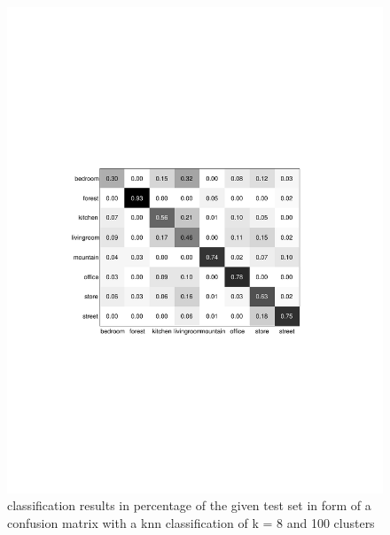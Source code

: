 \documentclass[subfigure,epsfig,fleqn,float,numbers=noenddot]{scrartcl}
\begin{document}
\begin{figure}
		\centering
		\includegraphics[width=\textwidth]{img/conf_matrix_k8_c100.pdf}
		\caption{classification results in percentage of the given test set in form of a confusion matrix with a knn classification of k = 8 and 100 clusters}
		\label{fig:cluster100}
\end{figure}
\end{document}
